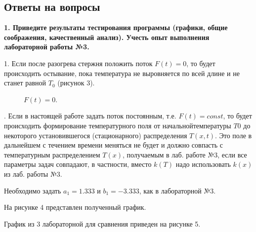 \documentclass[a4paper,14pt]{article}
\begin{document}
\newpage
\subsection*{Ответы на вопросы}

\textbf{1. Приведите результаты тестирования программы (графики, общие соображения, качественный анализ). Учесть опыт выполнения лабораторной работы №3.}

1. Если после разогрева стержня положить поток $F(t) = 0$, то будет происходить остывание, пока 
температура не выровняется по всей длине и не станет равной $T_0$ (рисунок 3).

\begin{figure}[!h]
	\caption{$F(t) = 0$.}
	\label{fig:image}
\end{figure}

. Если в настоящей работе задать поток постоянным, т.е. $F(t) = const$,
то будет происходить формирование температурного поля от начальнойтемпературы $T0$ 
до некоторого установившегося (стационарного) распределения $T(x,t)$. 
Это поле в дальнейшем с течением времени меняться не 
будет и должно совпасть с температурным распределением $T(x)$, 
получаемым в лаб. работе №3, если все параметры задач совпадают, 
в частности, вместо $k(T)$ надо использовать $k(x)$ из лаб. работы №3.

Необходимо задать $a_1 = 1.333$ и $b_1 = -3.333$, как в лабораторной №3.

На рисунке 4 представлен полученный график. 

График из 3 лабораторной для сравнения приведен на рисунке 5.
\end{document}
